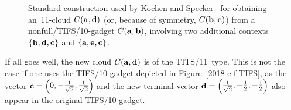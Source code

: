 \begin{figure}[H]
\begin{center}
\end{center}
\caption{
\label{2018-c-fcloud10-11}
Standard construction used by Kochen and Specker~\cite[Lemma~1, $\Gamma_1$, p.~68]{Kochen1}%
for obtaining an~11-cloud $C({\bf a},{\bf d})$ (or, because of symmetry, $C({\bf b},{\bf e})$)
from a nonfull/TIFS/10-gadget $C({\bf a},{\bf b})$,
involving two additional contexts $\left\{ {\bf b},{\bf d},{\bf c} \right\}$
and $\left\{ {\bf a},{\bf e} ,{\bf c} \right\}$.}
\end{figure}
If all goes well, the new cloud $C({\bf a},{\bf d})$ is of the TITS/11~type.
This is not the case if one uses the TIFS/10-gadget depicted in Figure~\ref{2018-c-f-TIFS},
as the vector
 ${\bf c} =
\begin{pmatrix}
0,
-\frac{1}{\sqrt{2}},
\frac{1}{\sqrt{2}}
\end{pmatrix}$
and the new terminal vector ${\bf d} =\begin{pmatrix}
 \frac{1}{\sqrt{2}},-\frac{1}{2},-\frac{1}{2}
\end{pmatrix}$
also appear in the original TIFS/10-gadget.


